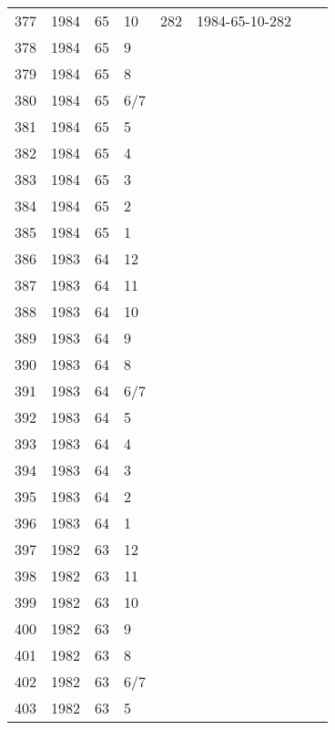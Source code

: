 \begin{longtable}{ |l|l|l|l|l|l|l|l| }
377 & 1984 & 65 &    10 &     282 & 1984-65-10-282 &  & \\
378 & 1984 & 65 &     9 &         &                &  & \\
379 & 1984 & 65 &     8 &         &                &  & \\
380 & 1984 & 65 &   6/7 &         &                &  & \\
381 & 1984 & 65 &     5 &         &                &  & \\
382 & 1984 & 65 &     4 &         &                &  & \\
383 & 1984 & 65 &     3 &         &                &  & \\
384 & 1984 & 65 &     2 &         &                &  & \\
385 & 1984 & 65 &     1 &         &                &  & \\
386 & 1983 & 64 &    12 &         &                &  & \\
387 & 1983 & 64 &    11 &         &                &  & \\
388 & 1983 & 64 &    10 &         &                &  & \\
389 & 1983 & 64 &     9 &         &                &  & \\
390 & 1983 & 64 &     8 &         &                &  & \\
391 & 1983 & 64 &   6/7 &         &                &  & \\
392 & 1983 & 64 &     5 &         &                &  & \\
393 & 1983 & 64 &     4 &         &                &  & \\
394 & 1983 & 64 &     3 &         &                &  & \\
395 & 1983 & 64 &     2 &         &                &  & \\
396 & 1983 & 64 &     1 &         &                &  & \\
397 & 1982 & 63 &    12 &         &                &  & \\
398 & 1982 & 63 &    11 &         &                &  & \\
399 & 1982 & 63 &    10 &         &                &  & \\
400 & 1982 & 63 &     9 &         &                &  & \\
401 & 1982 & 63 &     8 &         &                &  & \\
402 & 1982 & 63 &   6/7 &         &                &  & \\
403 & 1982 & 63 &     5 &         &                &  & \\

\end{longtable}
